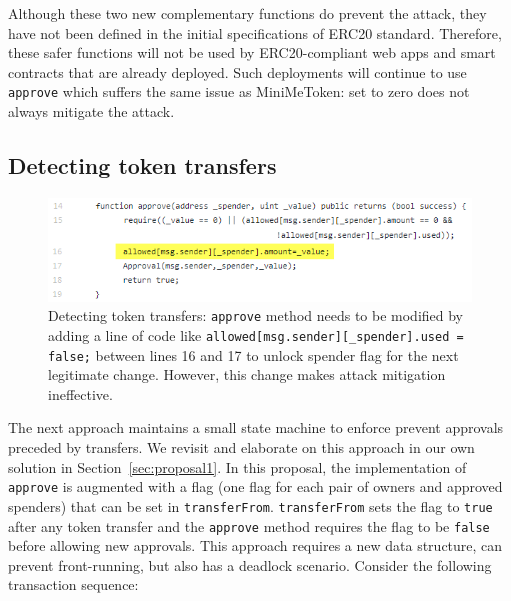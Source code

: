 Although these two new complementary functions do prevent the attack, they have not been defined in the initial specifications of ERC20 standard. Therefore, these safer functions will not be used by ERC20-compliant web apps and smart contracts that are already deployed. Such deployments will continue to use \texttt{approve} which suffers the same issue as MiniMeToken: set to zero does not always mitigate the attack. 



\subsection{Detecting token transfers}

\begin{figure}[t]
	\centering
	\includegraphics[width=1.0\linewidth]{figures/multiple_withdrawal_33.png}
	\caption{Detecting token transfers: \texttt{approve} method needs to be modified by adding a line of code like \texttt{allowed[msg.sender][\_spender].used = false;} between lines 16 and 17 to unlock spender flag for the next legitimate change. However, this change makes attack mitigation ineffective.\label{fig:det}}
\end{figure}

The next approach \cite{Ref17} maintains a small state machine to enforce prevent approvals preceded by transfers. We revisit and elaborate on this approach in our own solution in Section~\ref{sec:proposal1}. In this proposal, the implementation of \texttt{approve} is augmented with a flag (one flag for each pair of owners and approved spenders) that can be set in \texttt{transferFrom}. \texttt{transferFrom} sets the flag to \texttt{true} after any token transfer and the \texttt{approve} method requires the flag to be \texttt{false} before allowing new approvals. This approach requires a new data structure, can prevent front-running, but also has a deadlock scenario. Consider the following transaction sequence:


